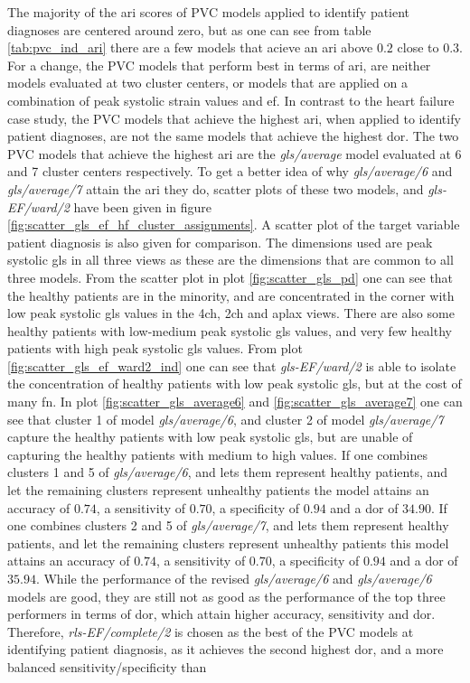 The majority of the \acrshort{ari} scores of PVC models applied to identify patient diagnoses are centered around zero, but as one can see from table \ref{tab:pvc_ind_ari} there are a few models that acieve an \acrshort{ari} above $0.2$ close to $0.3$. For a change, the PVC models that perform best in terms of \acrshort{ari}, are neither models evaluated at two cluster centers, or models that are applied on a combination of peak systolic strain values and \acrshort{ef}. In contrast to the heart failure case study, the PVC models that achieve the highest \acrshort{ari}, when applied to identify patient diagnoses, are not the same models that achieve the highest \acrshort{dor}. The two PVC models that achieve the highest \acrshort{ari} are the \textit{gls/average} model evaluated at 6 and 7 cluster centers respectively. To get a better idea of why \textit{gls/average/6} and \textit{gls/average/7} attain the \acrshort{ari} they do, scatter plots of these two models, and \textit{gls-EF/ward/2} have been given in figure \ref{fig:scatter_gls_ef_hf_cluster_assignments}. A scatter plot of the target variable patient diagnosis is also given for comparison. The dimensions used are peak systolic \acrshort{gls} in all three views as these are the dimensions that are common to all three models. From the scatter plot in plot \ref{fig:scatter_gls_pd} one can see that the healthy patients are in the minority, and are concentrated in the corner with low peak systolic \acrshort{gls} values in the \acrshort{4ch}, \acrshort{2ch} and \acrshort{aplax} views. There are also some healthy patients with low-medium peak systolic \acrshort{gls} values, and very few healthy patients with high peak systolic \acrshort{gls} values. From plot \ref{fig:scatter_gls_ef_ward2_ind} one can see that \textit{gls-EF/ward/2} is able to isolate the concentration of healthy patients with low peak systolic \acrshort{gls}, but at the cost of many \acrshort{fn}. In plot \ref{fig:scatter_gls_average6} and \ref{fig:scatter_gls_average7} one can see that cluster 1 of model \textit{gls/average/6}, and cluster 2 of model \textit{gls/average/7} capture the healthy patients with low peak systolic \acrshort{gls}, but are unable of capturing the healthy patients with medium to high values. If one combines clusters 1 and 5 of \textit{gls/average/6}, and lets them represent healthy patients, and let the remaining clusters represent unhealthy patients the model attains an accuracy of $0.74$, a sensitivity of $0.70$, a specificity of $0.94$ and a \acrshort{dor} of $34.90$. If one combines clusters 2 and 5 of \textit{gls/average/7}, and lets them represent healthy patients, and let the remaining clusters represent unhealthy patients this model attains an accuracy of $0.74$, a sensitivity of $0.70$, a specificity of $0.94$ and a \acrshort{dor} of $35.94$. While the performance of the revised \textit{gls/average/6} and \textit{gls/average/6} models are good, they are still not as good as the performance of the top three performers in terms of \acrshort{dor}, which attain higher accuracy, sensitivity and \acrshort{dor}. Therefore, \textit{rls-EF/complete/2} is chosen as the best of the PVC models at identifying patient diagnosis, as it achieves the second highest \acrshort{dor}, and a more balanced sensitivity/specificity than 